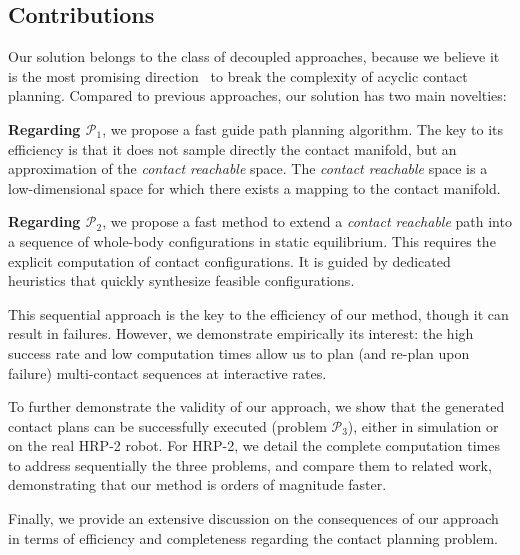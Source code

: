 \subsection{Contributions}

Our solution belongs to the class of decoupled approaches, because we believe it is the most promising direction~\citep{DBLP:conf/iser/EscandeKMG08} to break the complexity of acyclic contact planning. Compared to previous approaches, our solution has two main novelties: 

\noindent \textbf{Regarding $\mathcal{P}_1$}, we propose a fast guide path planning algorithm. The key to its efficiency is that it does not sample
directly the contact manifold, but an approximation of the \textit{contact reachable} space. The \textit{contact reachable} space is a low-dimensional space for which there exists a mapping to the contact manifold.

\noindent \textbf{Regarding $\mathcal{P}_2$},  we propose a fast method to extend a \textit{contact reachable} path into a sequence of whole-body configurations in static equilibrium. This  requires the explicit computation of contact configurations. It is guided by dedicated heuristics that quickly synthesize feasible configurations.

This sequential approach is the key to the efficiency of our method, though it
can result in failures. However, we demonstrate empirically its interest: the high success rate and low computation times allow us to plan (and re-plan upon failure) multi-contact sequences at \gls{interactive} rates.

To further demonstrate the validity of our approach, we show that the generated contact plans  can be successfully executed (problem  $\mathcal{P}_3$), either in simulation or on the real HRP-2 robot. For HRP-2, we detail the complete computation times to address sequentially the three problems, and compare them to related work, demonstrating that our method is orders of magnitude faster.

Finally, we provide an extensive discussion on the consequences of our approach in terms of efficiency and completeness regarding the contact planning problem. 




